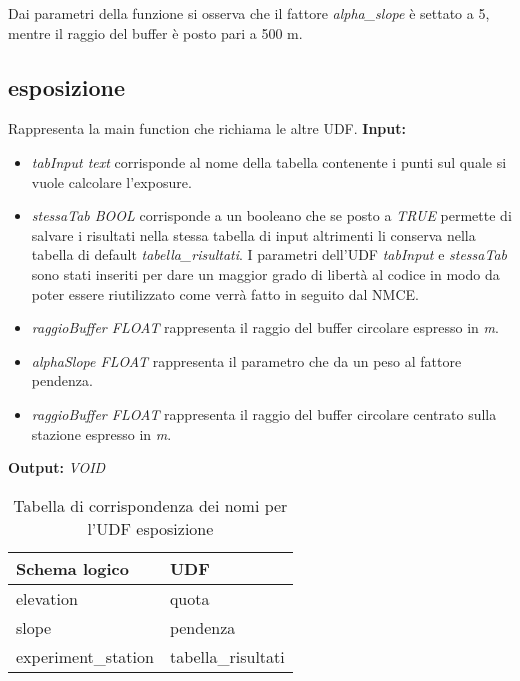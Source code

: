 Dai parametri della funzione si osserva che il fattore \textit{alpha\_slope} è settato a 5, mentre il raggio del buffer è posto pari a 500 m.

\subsection{esposizione}
Rappresenta la main function che richiama le altre UDF.
\textbf{Input:}
\begin{itemize}
\item \textit{tabInput text} corrisponde al nome della tabella contenente i punti sul quale si vuole calcolare l'exposure. 
\item \textit{stessaTab BOOL} corrisponde a un booleano che se posto a \textit{TRUE} permette di salvare i risultati nella stessa tabella di input altrimenti li conserva nella tabella di default \textit{tabella\_risultati}. I parametri dell'UDF \textit{tabInput} e \textit{stessaTab} sono stati inseriti per dare un maggior grado di libertà al codice in modo da poter essere riutilizzato come verrà fatto in seguito dal NMCE. 
\item \textit{raggioBuffer FLOAT} rappresenta il raggio del buffer circolare espresso in \textit{m}.
\item \textit{alphaSlope FLOAT} rappresenta il parametro che da un peso al fattore pendenza.
\item \textit{raggioBuffer FLOAT } rappresenta il raggio del buffer circolare centrato sulla stazione espresso in \textit{m}.
\end{itemize}
\textbf{Output:} \textit{VOID} 

\begin{table}[h]
\centering
\caption{Tabella di corrispondenza dei nomi per l'UDF esposizione}
\label{mapTb3}
\begin{tabular}{|l|l|}
\hline
Schema logico       & UDF                \\ \hline
elevation           & quota              \\
slope               & pendenza           \\
experiment\_station & tabella\_risultati \\ \hline
\end{tabular}
\end{table}

